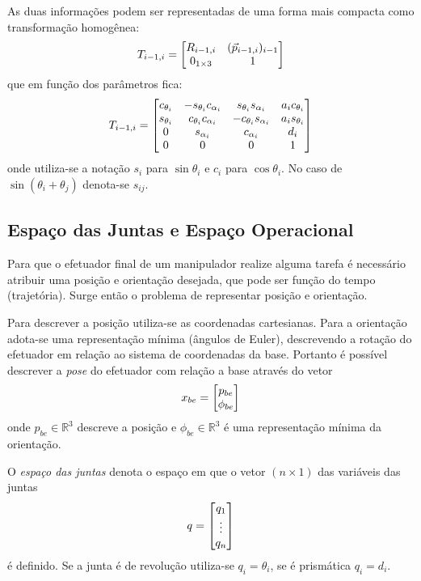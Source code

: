 As duas informações podem ser representadas de uma forma mais compacta como transformação homogênea:
\begin{equation}
T_{i-1,i} = \begin{bmatrix}
    R_{i-1,i}       &  ({\vec{p}}_{i-1,i})_{i-1} \\
    0_{1 \times 3}  &                             1
\end{bmatrix}
\end{equation}
que em função dos parâmetros fica:
\begin{equation} \label{eq:transform_dh}
T_{i-1,i} = \begin{bmatrix}
    c_{\theta_i}  & -s_{\theta_i}c_{\alpha_i}   &   s_{\theta_i}s_{\alpha_i}  & a_i c_{\theta_i} \\ 
    s_{\theta_i}  & c_{\theta_i}c_{\alpha_i}    &  -c_{\theta_i}s_{\alpha_i}  & a_i s_{\theta_i} \\
    0             & s_{\alpha_i}                &   c_{\alpha_i}              & d_i              \\
    0             & 0                           &   0                         & 1
\end{bmatrix}
\end{equation}
onde utiliza-se a notação $s_i$ para $\sin \theta_i$ e $c_i$ para $\cos \theta_i$. No caso de  $\sin (\theta_i + \theta_j)$ denota-se $s_{ij}$.

\subsection{Espaço das Juntas e Espaço Operacional}
Para que o efetuador final de um manipulador realize alguma tarefa é necessário atribuir uma posição e orientação desejada, que  pode ser função do tempo (trajetória). Surge então o problema de representar posição e orientação. 

Para descrever a posição utiliza-se as coordenadas cartesianas. Para a orientação adota-se uma representação mínima (ângulos de Euler), descrevendo a rotação do efetuador em relação ao sistema de coordenadas da base. Portanto é possível descrever a \textit{pose} do efetuador com relação a base através do vetor
\begin{equation} \label{eq:op_space}
{x}_{be} = \begin{bmatrix} {p}_{be} \\ {\phi}_{be}\end{bmatrix}
\end{equation}
onde ${p}_{be} \in \mathbb{R}^3$ descreve a posição e ${\phi}_{be} \in \mathbb{R}^3$ é uma representação mínima da orientação.

O \textit{espaço das juntas} denota o espaço em que o vetor $(n \times 1)$ das variáveis das juntas
\begin{equation} \label{eq:joint_space}
{q} = \begin{bmatrix}q_1 \\ \vdots \\ q_n\end{bmatrix}
\end{equation} 
é definido. Se a junta é de revolução utiliza-se $q_i = \theta_i$, se é prismática $q_i = d_i$.

